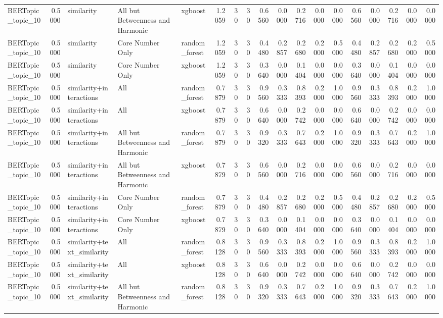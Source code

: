 \begin{tabular}{lrlllrrrrrrrrrrrrr}
BERTopic_topic_10 & 0.5000 & similarity & All but Betweenness and Harmonic & xgboost & 1.2059 & 30 & 30 & 0.6560 & 0.0000 & 0.2716 & 0.0000 & 0.0000 & 0.6560 & 0.0000 & 0.2716 & 0.0000 & 0.0000 \\
BERTopic_topic_10 & 0.5000 & similarity & Core Number Only & random_forest & 1.2059 & 30 & 30 & 0.4480 & 0.2857 & 0.2680 & 0.2000 & 0.5000 & 0.4480 & 0.2857 & 0.2680 & 0.2000 & 0.5000 \\
BERTopic_topic_10 & 0.5000 & similarity & Core Number Only & xgboost & 1.2059 & 30 & 30 & 0.3640 & 0.0000 & 0.1404 & 0.0000 & 0.0000 & 0.3640 & 0.0000 & 0.1404 & 0.0000 & 0.0000 \\
BERTopic_topic_10 & 0.5000 & similarity+interactions & All & random_forest & 0.7879 & 30 & 30 & 0.9560 & 0.3333 & 0.8393 & 0.2000 & 1.0000 & 0.9560 & 0.3333 & 0.8393 & 0.2000 & 1.0000 \\
BERTopic_topic_10 & 0.5000 & similarity+interactions & All & xgboost & 0.7879 & 30 & 30 & 0.6640 & 0.0000 & 0.2742 & 0.0000 & 0.0000 & 0.6640 & 0.0000 & 0.2742 & 0.0000 & 0.0000 \\
BERTopic_topic_10 & 0.5000 & similarity+interactions & All but Betweenness and Harmonic & random_forest & 0.7879 & 30 & 30 & 0.9320 & 0.3333 & 0.7643 & 0.2000 & 1.0000 & 0.9320 & 0.3333 & 0.7643 & 0.2000 & 1.0000 \\
BERTopic_topic_10 & 0.5000 & similarity+interactions & All but Betweenness and Harmonic & xgboost & 0.7879 & 30 & 30 & 0.6560 & 0.0000 & 0.2716 & 0.0000 & 0.0000 & 0.6560 & 0.0000 & 0.2716 & 0.0000 & 0.0000 \\
BERTopic_topic_10 & 0.5000 & similarity+interactions & Core Number Only & random_forest & 0.7879 & 30 & 30 & 0.4480 & 0.2857 & 0.2680 & 0.2000 & 0.5000 & 0.4480 & 0.2857 & 0.2680 & 0.2000 & 0.5000 \\
BERTopic_topic_10 & 0.5000 & similarity+interactions & Core Number Only & xgboost & 0.7879 & 30 & 30 & 0.3640 & 0.0000 & 0.1404 & 0.0000 & 0.0000 & 0.3640 & 0.0000 & 0.1404 & 0.0000 & 0.0000 \\
BERTopic_topic_10 & 0.5000 & similarity+text_similarity & All & random_forest & 0.8128 & 30 & 30 & 0.9560 & 0.3333 & 0.8393 & 0.2000 & 1.0000 & 0.9560 & 0.3333 & 0.8393 & 0.2000 & 1.0000 \\
BERTopic_topic_10 & 0.5000 & similarity+text_similarity & All & xgboost & 0.8128 & 30 & 30 & 0.6640 & 0.0000 & 0.2742 & 0.0000 & 0.0000 & 0.6640 & 0.0000 & 0.2742 & 0.0000 & 0.0000 \\
BERTopic_topic_10 & 0.5000 & similarity+text_similarity & All but Betweenness and Harmonic & random_forest & 0.8128 & 30 & 30 & 0.9320 & 0.3333 & 0.7643 & 0.2000 & 1.0000 & 0.9320 & 0.3333 & 0.7643 & 0.2000 & 1.0000 \\

\end{tabular}
